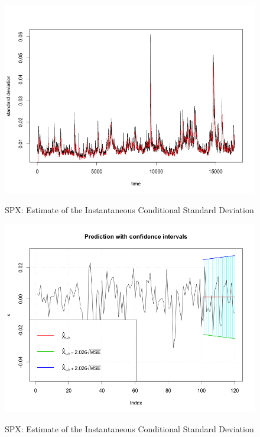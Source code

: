 \documentclass[12pt]{article}
\begin{document}
\begin{figure}
  \caption{SPX:   Estimate of the Instantaneous Conditional Standard Deviation}
  \includegraphics[width = \textwidth]{../results/SPX_GARCH_ESTsd}
  \label{fig:SPX_GARCH_ESTsd}
\end{figure}

\begin{figure}
  \caption{SPX:  Estimate of the Instantaneous Conditional Standard Deviation}
  \includegraphics[width = \textwidth]{../results/SPX_GARCH_predCI}
  \label{fig:SPX_GARCH_predCI}
\end{figure}
\end{document}
